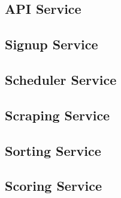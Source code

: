 \subsection{API Service}


\subsection{Signup Service}


\subsection{Scheduler Service}


\subsection{Scraping Service}


\subsection{Sorting Service}


\subsection{Scoring Service}

